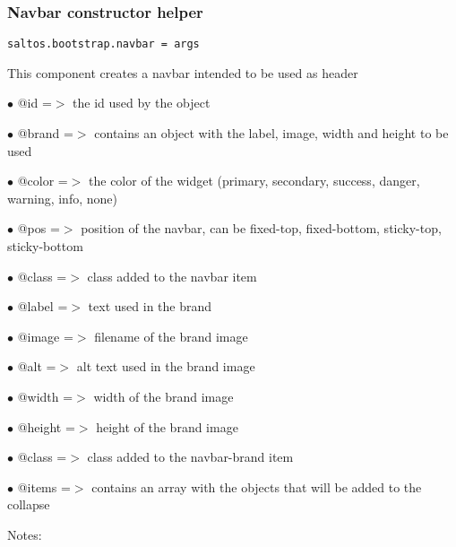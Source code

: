 \documentclass[a4paper]{article}
\begin{document}
\hypertarget{toc661}{}
\subsubsection{Navbar constructor helper}

\begin{lstlisting}
saltos.bootstrap.navbar = args
\end{lstlisting}

This component creates a navbar intended to be used as header

\begin{compactitem}
\item[\color{myblue}$\bullet$] @id    =$>$ the id used by the object
\item[\color{myblue}$\bullet$] @brand =$>$ contains an object with the label, image, width and height to be used
\item[\color{myblue}$\bullet$] @color =$>$ the color of the widget (primary, secondary, success, danger, warning, info, none)
\item[\color{myblue}$\bullet$] @pos   =$>$ position of the navbar, can be fixed-top, fixed-bottom, sticky-top, sticky-bottom
\item[\color{myblue}$\bullet$] @class =$>$ class added to the navbar item
\end{compactitem}

\begin{compactitem}
\item[\color{myblue}$\bullet$] @label  =$>$ text used in the brand
\item[\color{myblue}$\bullet$] @image  =$>$ filename of the brand image
\item[\color{myblue}$\bullet$] @alt    =$>$ alt text used in the brand image
\item[\color{myblue}$\bullet$] @width  =$>$ width of the brand image
\item[\color{myblue}$\bullet$] @height =$>$ height of the brand image
\item[\color{myblue}$\bullet$] @class  =$>$ class added to the navbar-brand item
\end{compactitem}

\begin{compactitem}
\item[\color{myblue}$\bullet$] @items =$>$ contains an array with the objects that will be added to the collapse
\end{compactitem}

Notes:
\end{document}

